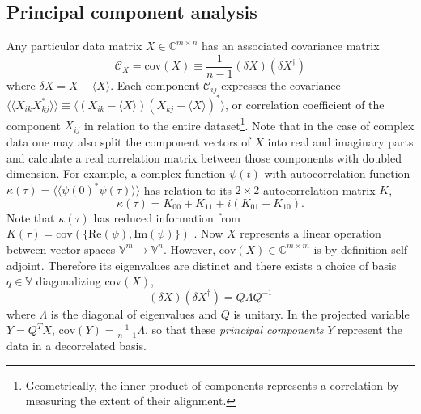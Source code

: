 \documentclass{article}
\begin{document}
\subsection{Principal component analysis}
Any particular data matrix $X\in\mathbb{C}^{m\times n}$ has an associated covariance matrix \cite{kutz}
\begin{equation}
  \mathcal{C}_X = \text{cov}(X) \equiv \frac{1}{n-1}(\delta X)(\delta X^\dagger)
\end{equation}
where $\delta X = X - \langle X\rangle$. Each component $\mathcal{C}_{ij}$ expresses the covariance $\langle\langle X_{ik}X^*_{kj}\rangle\rangle \equiv \langle (X_{ik} - \langle X\rangle)(X_{kj} - \langle X\rangle)^*\rangle$, or correlation coefficient of the component $X_{ij}$ in relation to the entire dataset\footnote{Geometrically, the inner product of components represents a correlation by measuring the extent of their alignment.}. Note that in the case of complex data one may also split the component vectors of $X$ into real and imaginary parts and calculate a real correlation matrix between those components with doubled dimension. For example, a complex function $\psi(t)$ with autocorrelation function $\kappa(\tau) = \langle\langle \psi(0)^*\psi(\tau)\rangle\rangle$ has relation to its $2\times 2$ autocorrelation matrix $K$,
\begin{equation}
\kappa(\tau) = K_{00} + K_{11} + i(K_{01} - K_{10}).
\end{equation}
Note that $\kappa(\tau)$ has reduced information from $K(\tau) = \text{cov}(\{\text{Re}(\psi),\text{Im}(\psi)\})$ \cite{vankampen}. Now $X$ represents a linear operation between vector spaces $\mathbb{V}^m\to\mathbb{V}^n$. However, $\text{cov}(X)\in\mathbb{C}^{m\times m}$ is by definition self-adjoint. Therefore its eigenvalues are distinct and there exists a choice of basis $q\in\mathbb{V}$ diagonalizing $\text{cov}(X)$,
\begin{equation}
  (\delta X)(\delta X^\dagger) = Q\Lambda Q^{-1}
\end{equation}
where $\Lambda$ is the diagonal of eigenvalues and $Q$ is unitary. In the projected variable $Y = Q^TX$, $\text{cov}(Y) = \frac{1}{n-1}\Lambda$, so that these \textit{principal components} $Y$ represent the data in a decorrelated basis.%
\end{document}
